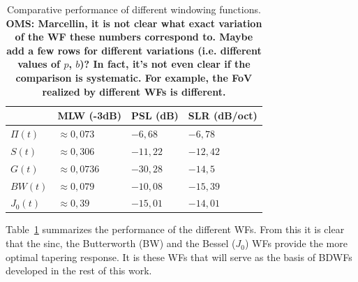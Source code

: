 \documentclass[useAMS,usenatbib]{mn2e}
\begin{document}

\begin{table}
\begin{tabular}{llll}
\hline
& {\bf MLW} (-3dB) & {\bf PSL} (dB) & {\bf SLR} (dB/oct)  \\
\hline\hline
$\Pi(t)$ &$\approx 0,073$ &$-6,68$ &$-6,78$\\
$S(t)$ & $\approx0,306$& $-11,22$&  $-12,42$ \\
$G(t)$ & $\approx0,0736$& $-30,28$& $-14,5$\\ 
$BW(t)$ & $\approx0,079$ &$-10,08$ & $-15,39$\\
$J_0(t)$ & $\approx 0,39$ &$ -15,01$ & $ -14,01$
\end{tabular}
\caption{\label{tab:WF:performance}Comparative performance of 
different windowing functions. \bf{OMS: Marcellin, it is not clear what exact variation of the
WF these numbers correspond to. Maybe add a few rows for different variations (i.e. different values
of $p$, $b$)? In fact, it's not even clear if the comparison is systematic. For example, the FoV realized 
by different WFs is different.}}
\end{table}

Table~\ref{tab:WF:performance} summarizes the performance of the different WFs. From this it is clear that
the sinc, the Butterworth (BW) and the Bessel ($J_0$) WFs provide the more optimal tapering response. It is these WFs that
will serve as the basis of BDWFs developed in the rest of this work. 
\end{document}
